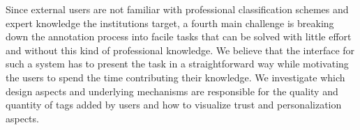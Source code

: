 Since external users are not familiar with professional classification schemes and expert knowledge the institutions target, a fourth main challenge is breaking down the annotation process into facile tasks that can be solved with little effort and without this kind of professional knowledge. %
We believe that the interface for such a system has to present the task in a straightforward way while motivating the users to spend the time contributing their knowledge. We investigate which design aspects and underlying mechanisms are responsible for the quality and quantity of tags added by users and how to visualize trust and personalization aspects.

